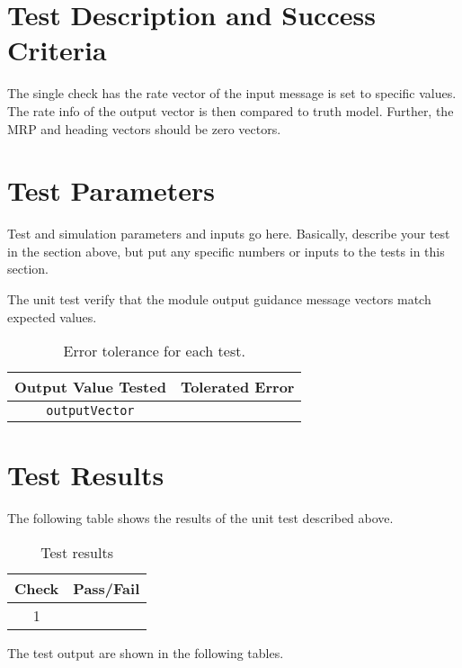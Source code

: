 
\section{Test Description and Success Criteria}
The single check has the rate vector of the input message is set to specific values.  The rate info of the output vector is then compared to truth model.  Further, the MRP and heading vectors should be zero vectors.




\section{Test Parameters}

Test and simulation parameters and inputs go here. Basically, describe your test in the section above, but put any specific numbers or inputs to the tests in this section.

The unit test verify that the module output guidance message vectors match expected values.
\begin{table}[htbp]
	\caption{Error tolerance for each test.}
	\label{tab:errortol}
	\centering \fontsize{10}{10}\selectfont
	\begin{tabular}{ c | c } %
		\hline\hline
		\textbf{Output Value Tested}  & \textbf{Tolerated Error}  \\ 
		\hline
		{\tt outputVector}        & 	   \\ 
		\hline\hline
	\end{tabular}
\end{table}




\section{Test Results}
The following table shows the results of the unit test described above.

\begin{table}[H]
	\caption{Test results}
	\label{tab:results}
	\centering \fontsize{10}{10}\selectfont
	\begin{tabular}{c | c  } %
		\hline\hline
		\textbf{Check} 						  		&\textbf{Pass/Fail} \\ 
		\hline
	   1	   			&  \\ 
	   \hline\hline
	\end{tabular}
\end{table}



The test output are shown in the following tables.








